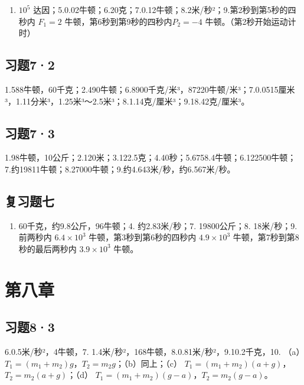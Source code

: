 \begin{enumerate}
\def\labelenumi{\arabic{enumi}.}
\tightlist
\item
  \(10^{5}\)
  达因；5.0.02牛顿；6.20克；7.0.12牛顿；8.2米/秒²；9.第2秒到第5秒的四秒内
  \(F_{1}=2\) 牛顿，第6秒到第9秒的四秒内\(P_{2}=-4\)
  牛顿。（第2秒开始运动计时）
\end{enumerate}

\subsection{习题7·2}\label{ux4e60ux989872-1}

1.588牛顿，60千克；2.490牛顿；6.8900千克/米³，87220牛顿/米³；7.0.0515厘米³，1.11分米³，1.25米³～2.5米³；8.1.14克/厘米³；9.18.42克/厘米³。

\subsection{习题7·3}\label{ux4e60ux989873-1}

1.98牛顿，10公斤；2.120米；3.122.5克；4.40秒；5.6758.4牛顿；6.122500牛顿；7.约19811牛顿；8.27000牛顿；9.约4.643米/秒，约6.567米/秒。

\subsection{复习题七}\label{ux590dux4e60ux9898ux4e03-1}

\begin{enumerate}
\def\labelenumi{\arabic{enumi}.}
\tightlist
\item
  60千克，约9.8公斤，96牛顿；4. 约2.83米/秒；7. 19800公斤；8.
  18米/秒；9. 前两秒内 \(6.4 \times 10^{3}\) 牛顿，第3秒到第6秒的四秒内
  \(4.9 \times 10^{3}\) 牛顿，第7秒到第8秒的最后两秒内
  \(3.9 \times 10^{3}\) 牛顿。
\end{enumerate}

\section{第八章}\label{ux7b2cux516bux7ae0}

\subsection{习题8·3}\label{ux4e60ux989883-1}

6.0.5米/秒²，4牛顿，7. 1.4米/秒²，168牛顿，8.0.81米/秒²，9.10.2千克，10.
（a）\(T_{1}=(m_{1}+m_{2})g\)，\(T_{2}=m_{2}g\)；（b）同上；（c）
\(T_{1}=(m_{1}+m_{2})(a+g)\)，\(T_{2}=m_{2}(a+g)\)；（d）
\(T_{1}=(m_{1}+m_{2})(g-a)\)，\(T_{2}=m_{2}(g-a)\)。

